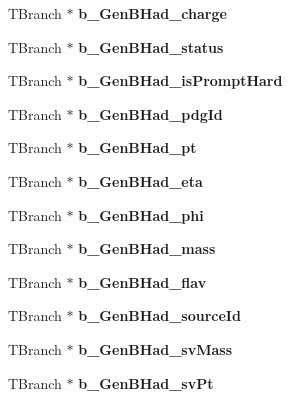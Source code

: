 \begin{DoxyCompactItemize}
T\+Branch $\ast$ {\bfseries b\+\_\+\+Gen\+B\+Had\+\_\+charge}
\item 
\hypertarget{classMiniTree_a54e3fc35053018b3dcc6b036e1711ea5}{}\label{classMiniTree_a54e3fc35053018b3dcc6b036e1711ea5} 
T\+Branch $\ast$ {\bfseries b\+\_\+\+Gen\+B\+Had\+\_\+status}
\item 
\hypertarget{classMiniTree_a14059603e4da897188b2a95aec554d4f}{}\label{classMiniTree_a14059603e4da897188b2a95aec554d4f} 
T\+Branch $\ast$ {\bfseries b\+\_\+\+Gen\+B\+Had\+\_\+is\+Prompt\+Hard}
\item 
\hypertarget{classMiniTree_ada6878e6bca95da723fb8cea4ded6fb5}{}\label{classMiniTree_ada6878e6bca95da723fb8cea4ded6fb5} 
T\+Branch $\ast$ {\bfseries b\+\_\+\+Gen\+B\+Had\+\_\+pdg\+Id}
\item 
\hypertarget{classMiniTree_a9c2e6790abb20b75a16cb7ab9adeacab}{}\label{classMiniTree_a9c2e6790abb20b75a16cb7ab9adeacab} 
T\+Branch $\ast$ {\bfseries b\+\_\+\+Gen\+B\+Had\+\_\+pt}
\item 
\hypertarget{classMiniTree_afcd8fe31fefd1d45cb76d60af4b78b15}{}\label{classMiniTree_afcd8fe31fefd1d45cb76d60af4b78b15} 
T\+Branch $\ast$ {\bfseries b\+\_\+\+Gen\+B\+Had\+\_\+eta}
\item 
\hypertarget{classMiniTree_a974f83315390f123393348bd076dae74}{}\label{classMiniTree_a974f83315390f123393348bd076dae74} 
T\+Branch $\ast$ {\bfseries b\+\_\+\+Gen\+B\+Had\+\_\+phi}
\item 
\hypertarget{classMiniTree_a1b676a9ca5b23a61a3f87f6a14121d3b}{}\label{classMiniTree_a1b676a9ca5b23a61a3f87f6a14121d3b} 
T\+Branch $\ast$ {\bfseries b\+\_\+\+Gen\+B\+Had\+\_\+mass}
\item 
\hypertarget{classMiniTree_af493815b65d8104dd82920938b45b493}{}\label{classMiniTree_af493815b65d8104dd82920938b45b493} 
T\+Branch $\ast$ {\bfseries b\+\_\+\+Gen\+B\+Had\+\_\+flav}
\item 
\hypertarget{classMiniTree_a6b06794e59618c2293f087e0d05f0d74}{}\label{classMiniTree_a6b06794e59618c2293f087e0d05f0d74} 
T\+Branch $\ast$ {\bfseries b\+\_\+\+Gen\+B\+Had\+\_\+source\+Id}
\item 
\hypertarget{classMiniTree_ad4aa808b4730621419ba17b80f27c5f6}{}\label{classMiniTree_ad4aa808b4730621419ba17b80f27c5f6} 
T\+Branch $\ast$ {\bfseries b\+\_\+\+Gen\+B\+Had\+\_\+sv\+Mass}
\item 
\hypertarget{classMiniTree_a1b89d9308b9d7df459b1d7f2fc43826f}{}\label{classMiniTree_a1b89d9308b9d7df459b1d7f2fc43826f} 
T\+Branch $\ast$ {\bfseries b\+\_\+\+Gen\+B\+Had\+\_\+sv\+Pt}
\item 

\end{DoxyCompactItemize}
